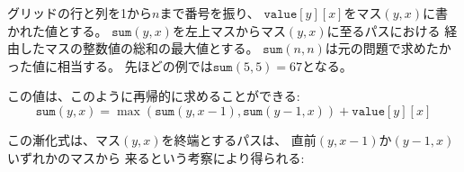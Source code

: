 グリッドの行と列を1から$n$まで番号を振り、
$\texttt{value}[y][x]$をマス$(y,x)$に書かれた値とする。
$\texttt{sum}(y,x)$を左上マスからマス$(y,x)$に至るパスにおける
経由したマスの整数値の総和の最大値とする。
$\texttt{sum}(n,n)$は元の問題で求めたかった値に相当する。
先ほどの例では$\texttt{sum}(5,5)=67$となる。

\begin{comment}
We can recursively calculate the sums
as follows:
\[ \texttt{sum}(y,x) = \max(\texttt{sum}(y,x-1),\texttt{sum}(y-1,x))+\texttt{value}[y][x]\]


The recursive formula is based on the observation
that a path that ends at square $(y,x)$
can come either from square $(y,x-1)$
or square $(y-1,x)$:
\end{comment}

この値は、このように再帰的に求めることができる:
\[ \texttt{sum}(y,x) = \max(\texttt{sum}(y,x-1),\texttt{sum}(y-1,x))+\texttt{value}[y][x]\]

この漸化式は、マス$(y,x)$を終端とするパスは、
直前$(y,x-1)$か$(y-1,x)$いずれかのマスから
来るという考察により得られる:
\begin{center}
\end{center}

\begin{comment}
Thus, we select the direction that maximizes
the sum.
We assume that $\texttt{sum}(y,x)=0$
if $y=0$ or $x=0$ (because no such paths exist),
so the recursive formula also works when $y=1$ or $x=1$.

Since the function \texttt{sum} has two parameters,
the dynamic programming array also has two dimensions.
For example, we can use an array
\begin{lstlisting}
int sum[N][N];
\end{lstlisting}
and calculate the sums as follows:
\begin{lstlisting}
for (int y = 1; y <= n; y++) {
    for (int x = 1; x <= n; x++) {
        sum[y][x] = max(sum[y][x-1],sum[y-1][x])+value[y][x];
    }
}
\end{lstlisting}
The time complexity of the algorithm is $O(n^2)$.
\end{comment}

